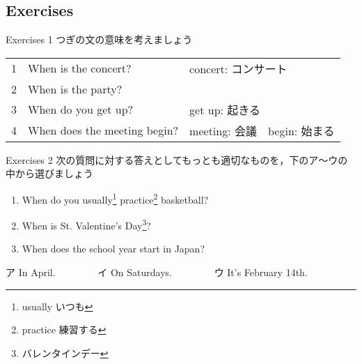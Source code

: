 \documentclass[aspectratio=169,xcolor={dvipsnames,table}]{beamer}
\begin{document}
\subsection{Exercises}
\begin{frame}[plain]{Exercises 1}
つぎの文の意味を考えましょう

\begin{tabular}{rll}
1& When is the concert? &{\scriptsize concert: コンサート} \\
2& When is the party?& \\
3& When do you get up? & {\scriptsize get up: 起きる}\\
4& When does the meeting begin?&{\scriptsize meeting: 会議　begin: 始まる} \\
\end{tabular}


\mbox{}\hfill{}

\end{frame}

\begin{frame}[plain]{Exercises 2}
 次の質問に対する答えとしてもっとも適切なものを，下のア～ウの中から選びましょう

\begin{enumerate}
 \item When do you usually\footnote{usually  いつも} practice\footnote{practice  練習する} basketball?\hspace{10pt}\hspace{21pt}
 \item When is St. Valentine's Day\footnote{バレンタインデー}?\hspace{80pt}\hspace{12pt}
 \item When does the school year start in Japan?\hspace{15pt}\hspace{50pt}
\end{enumerate}

\begin{tcolorbox}
\centering
ア In April.~~~~~~~~%
イ On Saturdays.~~~~~~~~%
ウ It's February 14th. 
\end{tcolorbox}

%
\mbox{}\hfill{}


\end{frame}
\end{document}
